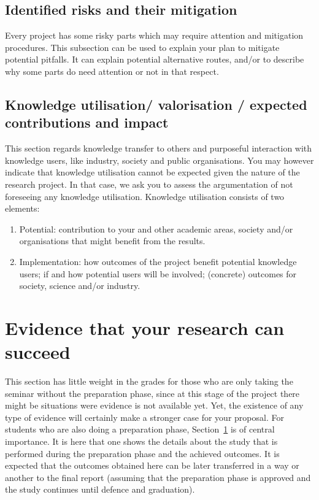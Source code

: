 \documentclass{article}
\begin{document}
\subsection{Identified risks and their mitigation}

Every project has some risky parts which may require attention and mitigation procedures. This subsection can be used to explain your plan to mitigate potential pitfalls. It can explain potential alternative routes, and/or to describe why some parts do need attention or not in that respect.

\subsection{Knowledge utilisation/ valorisation / expected contributions and impact}

This section regards knowledge transfer to others and purposeful interaction with knowledge users, like industry, society and public organisations. You may however indicate that knowledge utilisation cannot be expected given the nature of the research project. In that case, we ask you to assess the argumentation of not foreseeing any knowledge utilisation. Knowledge utilisation consists of two elements:

\begin{enumerate}
  \item Potential: contribution to your and other academic areas, society and/or organisations that might benefit from the results.

  \item Implementation: how outcomes of the project benefit potential knowledge users; if and how potential users will be involved; (concrete) outcomes for society, science and/or industry.
\end{enumerate}


\section{Evidence that your research can succeed}\label{sec:evidence}

This section has little weight in the grades for those who are only taking the seminar without the preparation phase, since at this stage of the project there might be situations were evidence is not available yet. Yet, the existence of any type of evidence will certainly make a stronger case for your proposal. For students who are also doing a preparation phase, Section~\ref{sec:evidence} is of central importance. It is here that one shows the details about the study that is performed during the preparation phase and the achieved outcomes. It is expected that the outcomes obtained here can be later transferred in a way or another to the final report (assuming that the preparation phase is approved and the study continues until defence and graduation).
\end{document}
